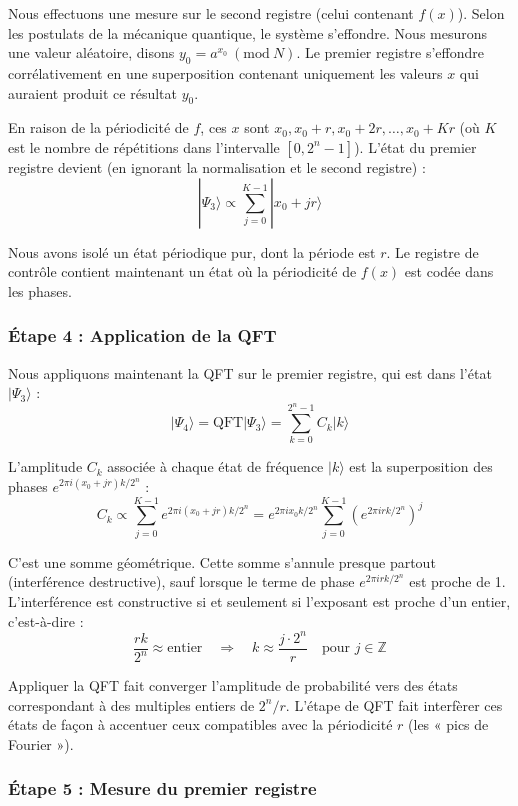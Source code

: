 \documentclass[11pt,a4paper]{article}
\newcommand{\Mod}[1]{\ (\mathrm{mod}\ #1)}
\begin{document}
Nous effectuons une mesure sur le second registre (celui contenant $f(x)$). Selon les postulats de la mécanique quantique, le système s'effondre. Nous mesurons une valeur aléatoire, disons $y_0 = a^{x_0} \Mod{N}$. Le premier registre s'effondre corrélativement en une superposition contenant uniquement les valeurs $x$ qui auraient produit ce résultat $y_0$.

En raison de la périodicité de $f$, ces $x$ sont $x_0, x_0 + r, x_0 + 2r, \ldots, x_0 + Kr$ (où $K$ est le nombre de répétitions dans l'intervalle $[0, 2^n - 1]$). L'état du premier registre devient (en ignorant la normalisation et le second registre) :
\[|\Psi_3\rangle \propto \sum_{j=0}^{K-1}|x_0 + jr\rangle\]

Nous avons isolé un état périodique pur, dont la période est $r$. Le registre de contrôle contient maintenant un état où la périodicité de $f(x)$ est codée dans les phases.

\subsubsection*{Étape 4 : Application de la QFT}

Nous appliquons maintenant la QFT sur le premier registre, qui est dans l'état $|\Psi_3\rangle$ :
\[|\Psi_4\rangle = \text{QFT}|\Psi_3\rangle = \sum_{k=0}^{2^n-1}C_k|k\rangle\]

L'amplitude $C_k$ associée à chaque état de fréquence $|k\rangle$ est la superposition des phases $e^{2\pi i(x_0+jr)k/2^n}$ :
\[C_k \propto \sum_{j=0}^{K-1}e^{2\pi i(x_0+jr)k/2^n} = e^{2\pi ix_0k/2^n}\sum_{j=0}^{K-1}\left(e^{2\pi irk/2^n}\right)^j\]

C'est une somme géométrique. Cette somme s'annule presque partout (interférence destructive), sauf lorsque le terme de phase $e^{2\pi irk/2^n}$ est proche de 1. L'interférence est constructive si et seulement si l'exposant est proche d'un entier, c'est-à-dire :
\[\frac{rk}{2^n} \approx \text{entier} \quad \Longrightarrow \quad k \approx \frac{j \cdot 2^n}{r} \quad \text{pour } j \in \mathbb{Z}\]

Appliquer la QFT fait converger l'amplitude de probabilité vers des états correspondant à des multiples entiers de $2^n/r$. L'étape de QFT fait interfèrer ces états de façon à accentuer ceux compatibles avec la périodicité $r$ (les « pics de Fourier »).

\subsubsection*{Étape 5 : Mesure du premier registre}
\end{document}
